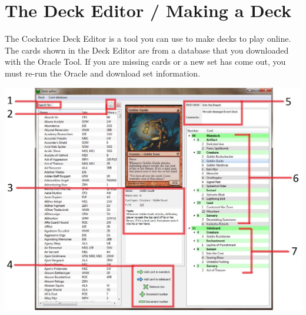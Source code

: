 \documentclass[a4paper]{scrbook}
\begin{document}
\section{The Deck Editor / Making a Deck}
The Cockatrice Deck Editor is a tool you can use to make decks to play online.
The cards shown in the Deck Editor are from a database that you downloaded with the Oracle Tool. If you are missing cards or a new set has come out, you must re-run the Oracle and download set information.
\begin{center}
\includegraphics[scale=0.55]{pics/fetch52e0}
\end{center}
\end{document}
